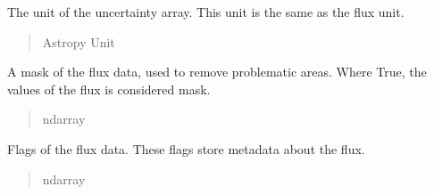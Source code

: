 \documentclass[letterpaper,11pt,english]{sphinxmanual}
\begin{document}
\begin{savenotes}
\begin{fulllineitems}
\begin{savenotes}\begin{fulllineitems}
\label{\detokenize{code/lezargus.container.spectra:lezargus.container.spectra.LezargusSpectra.uncertainty_unit}}
\pysigstartsignatures
{}
\pysigstopsignatures
\sphinxAtStartPar
The unit of the uncertainty array. This unit is the same as the flux
unit.
\begin{quote}\begin{description}
\sphinxAtStartPar
Astropy Unit

\end{description}\end{quote}

\end{fulllineitems}\end{savenotes}


\begin{savenotes}\begin{fulllineitems}
\label{\detokenize{code/lezargus.container.spectra:lezargus.container.spectra.LezargusSpectra.mask}}
\pysigstartsignatures
{}
\pysigstopsignatures
\sphinxAtStartPar
A mask of the flux data, used to remove problematic areas. Where True,
the values of the flux is considered mask.
\begin{quote}\begin{description}
\sphinxAtStartPar
ndarray

\end{description}\end{quote}

\end{fulllineitems}\end{savenotes}


\begin{savenotes}\begin{fulllineitems}
\label{\detokenize{code/lezargus.container.spectra:lezargus.container.spectra.LezargusSpectra.flags}}
\pysigstartsignatures
{}
\pysigstopsignatures
\sphinxAtStartPar
Flags of the flux data. These flags store metadata about the flux.
\begin{quote}\begin{description}
\sphinxAtStartPar
ndarray


\end{description}
\end{quote}
\end{fulllineitems}
\end{savenotes}
\end{fulllineitems}
\end{savenotes}
\end{document}
